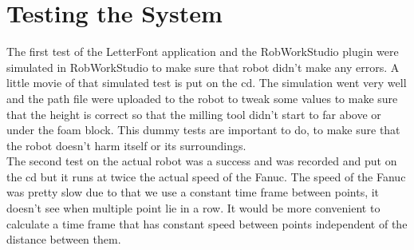 \section{Testing the System}
\label{sec:test}

The first test of the LetterFont application and the RobWorkStudio plugin were simulated in RobWorkStudio to make sure that robot didn't make any errors. A little movie of that simulated test is put on the cd. The simulation went very well and the path file were uploaded to the robot to tweak some values to make sure that the height is correct so that the milling tool didn't start to far above or under the foam block. This dummy tests are important to do, to make sure that the robot doesn't harm itself or its surroundings.
\\The second test on the actual robot was a success and was recorded and put on the cd but it runs at twice the actual speed of the Fanuc. The speed of the Fanuc was pretty slow due to that we use a constant time frame between points, it doesn't see when multiple point lie in a row. It would be more convenient to calculate a time frame that has constant speed between points independent of the distance between them.